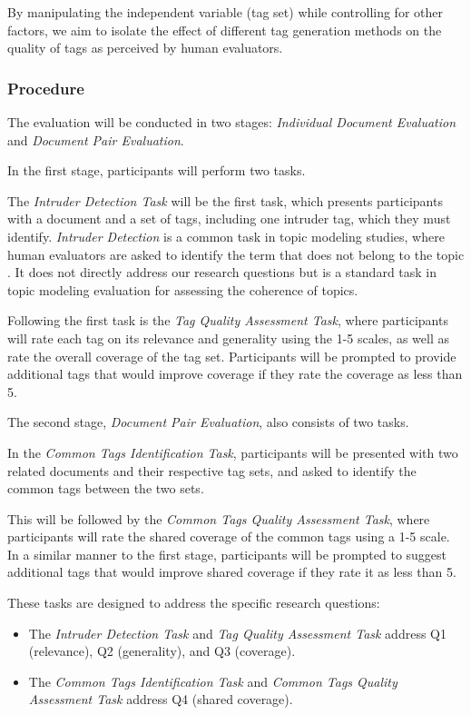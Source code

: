 By manipulating the independent variable (tag set) while controlling for other factors, we aim to isolate the effect of different tag generation methods on the quality of tags as perceived by human evaluators.

\subsubsection{Procedure}
The evaluation will be conducted in two stages: \textit{Individual Document Evaluation} and \textit{Document Pair Evaluation}.

In the first stage, participants will perform two tasks.

The \textit{Intruder Detection Task} will be the first task, which presents participants with a document and a set of tags, including one intruder tag, which they must identify. \textit{Intruder Detection} is a common task in topic modeling studies, where human evaluators are asked to identify the term that does not belong to the topic \cite{chang_reading_2009, newman_evaluating_2010, musil_exploring_2024, lau_machine_2014, bhatia_automatic_2017, hoyle_is_2021}. It does not directly address our research questions but is a standard task in topic modeling evaluation for assessing the coherence of topics.

Following the first task is the \textit{Tag Quality Assessment Task}, where participants will rate each tag on its relevance and generality using the 1-5 scales, as well as rate the overall coverage of the tag set. Participants will be prompted to provide additional tags that would improve coverage if they rate the coverage as less than 5.

The second stage, \textit{Document Pair Evaluation}, also consists of two tasks.

In the \textit{Common Tags Identification Task}, participants will be presented with two related documents and their respective tag sets, and asked to identify the common tags between the two sets.

This will be followed by the \textit{Common Tags Quality Assessment Task}, where participants will rate the shared coverage of the common tags using a 1-5 scale. In a similar manner to the first stage, participants will be prompted to suggest additional tags that would improve shared coverage if they rate it as less than 5.

These tasks are designed to address the specific research questions:
\begin{itemize}
\item The \textit{Intruder Detection Task} and \textit{Tag Quality Assessment Task} address Q1 (relevance), Q2 (generality), and Q3 (coverage).
\item The \textit{Common Tags Identification Task} and \textit{Common Tags Quality Assessment Task} address Q4 (shared coverage).
\end{itemize}

